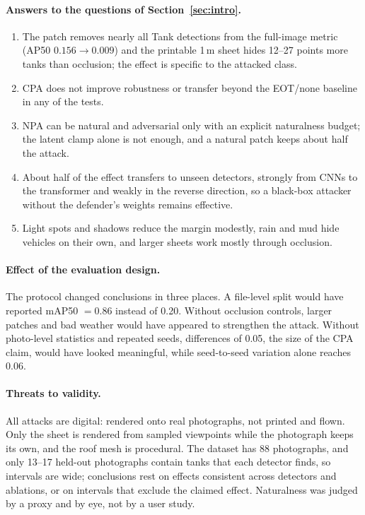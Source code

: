 \documentclass[11pt,a4paper]{article}
\begin{document}
\paragraph{Answers to the questions of Section~\ref{sec:intro}.}
\begin{enumerate}
  \item The patch removes nearly all Tank detections from the full-image metric (AP50 $0.156\to0.009$) and the printable 1\,m sheet hides 12--27 points more tanks than occlusion; the effect is specific to the attacked class.
  \item CPA does not improve robustness or transfer beyond the EOT/none baseline in any of the tests.
  \item NPA can be natural and adversarial only with an explicit naturalness budget; the latent clamp alone is not enough, and a natural patch keeps about half the attack.
  \item About half of the effect transfers to unseen detectors, strongly from CNNs to the transformer and weakly in the reverse direction, so a black-box attacker without the defender's weights remains effective.
  \item Light spots and shadows reduce the margin modestly, rain and mud hide vehicles on their own, and larger sheets work mostly through occlusion.
\end{enumerate}

\paragraph{Effect of the evaluation design.} The protocol changed conclusions in three places. A file-level split would have reported mAP50 $=0.86$ instead of 0.20. Without occlusion controls, larger patches and bad weather would have appeared to strengthen the attack. Without photo-level statistics and repeated seeds, differences of 0.05, the size of the CPA claim, would have looked meaningful, while seed-to-seed variation alone reaches 0.06.

\paragraph{Threats to validity.} All attacks are digital: rendered onto real photographs, not printed and flown. Only the sheet is rendered from sampled viewpoints while the photograph keeps its own, and the roof mesh is procedural. The dataset has 88 photographs, and only 13--17 held-out photographs contain tanks that each detector finds, so intervals are wide; conclusions rest on effects consistent across detectors and ablations, or on intervals that exclude the claimed effect. Naturalness was judged by a proxy and by eye, not by a user study.
\end{document}
